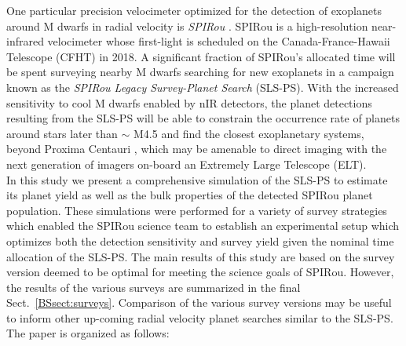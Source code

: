 One particular precision velocimeter optimized for the detection of
exoplanets around M dwarfs in radial velocity is \emph{SPIRou} \citep[Un
  Spectro-Polarim\`{e}tre Infra-Rouge;][]{delfosse13, artigau14}. SPIRou
is a high-resolution near-infrared velocimeter whose first-light is scheduled on
the Canada-France-Hawaii Telescope (CFHT) in 2018. A significant fraction of SPIRou's
allocated time will be spent surveying
nearby M dwarfs searching for new exoplanets in a campaign known as the
\emph{SPIRou Legacy Survey-Planet Search} (SLS-PS). With the increased
sensitivity to cool M dwarfs enabled by nIR detectors, the planet detections
resulting from the
SLS-PS will be able to constrain the occurrence rate of planets around stars
later than $\sim$ M4.5 and find the closest exoplanetary
systems, beyond Proxima Centauri \citep[1.3 pc;][]{angladaescude16}, which
may be amenable to direct imaging with the next generation of imagers on-board
an Extremely Large Telescope (ELT). \\

In this study we present a comprehensive simulation of the SLS-PS to estimate its
planet yield as well as the bulk properties of the detected SPIRou planet population.
These simulations were performed for a variety
of survey strategies which enabled the SPIRou science team to establish an
experimental setup which optimizes both the detection sensitivity and survey
yield given the nominal time allocation of the SLS-PS. The main results of this
study are based on the survey version deemed to be optimal for meeting the 
science goals of SPIRou. However, the results of the
various surveys are summarized in the final Sect.~\ref{BSsect:surveys}. Comparison
of the various survey versions may be useful to inform other up-coming radial velocity
planet searches similar to the SLS-PS. \\

The paper is organized as follows:

